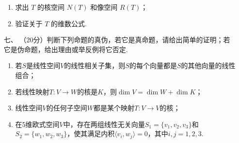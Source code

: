 \begin{enumerate}
    \begin{enumerate}
        \item 求出 $T$ 的核空间 $N(T)$ 和像空间 $R(T)$；
        \item 验证关于 $T$ 的维数公式.
    \end{enumerate}
	\item[七、]（20分）判断下列命题的真伪，若它是真命题，请给出简单的证明；若它是伪命题，给出理由或举反例将它否定.
	\begin{enumerate}[label=(\arabic*)]
        \item 若$S$是线性空间$V$的线性相关子集，则$S$的每个向量都是$S$的其他向量的线性组合；
        \item 若线性映射$T:V\to W$的核是$K$，则$\dim V=\dim W+\dim K$；
        \item 线性空间$V$的任何子空间$W$都是某个映射$T:V\to V$的核；
        \item 在5维欧式空间$V$中，存在两组线性无关向量$S_1=\{v_1,v_2,v_3\}$和$S_2=\{w_1,w_2,w_3\}$，使其满足内积$\langle v_i,w_j\rangle=0$，其中$i,j=1,2,3$.
    \end{enumerate}
\end{enumerate}

\newpage
